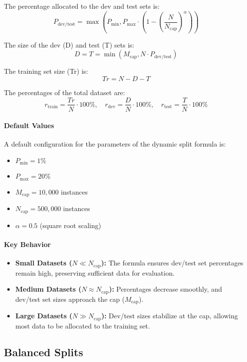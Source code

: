 \documentclass[12pt,openany, draft]{book}
\begin{document}
\vspace{2em}

The percentage allocated to the dev and test sets is:
\[
P_{\text{dev/test}} = \max\left(P_{\text{min}}, P_{\text{max}} \cdot \left(1 - \left(\frac{N}{N_{\text{cap}}}\right)^\alpha\right)\right)
\]

The size of the dev (D) and test (T) sets is:
\[
D = T = \min(M_{\text{cap}}, N \cdot P_{\text{dev/test}})
\]

The training set size (Tr) is:
\[
Tr = N - D - T
\]

The percentages of the total dataset are:
\[
r_{\text{train}} = \frac{Tr}{N} \cdot 100\%, \quad r_{\text{dev}} = \frac{D}{N} \cdot 100\%, \quad r_{\text{test}} = \frac{T}{N} \cdot 100\%
\]

\paragraph{Default Values}
A default configuration for the parameters of the dynamic split formula is:
\begin{itemize}
    \item \(P_{\text{min}} = 1\%\)
    \item \(P_{\text{max}} = 20\%\)
    \item \(M_{\text{cap}} = 10,000\) instances
    \item \(N_{\text{cap}} = 500,000\) instances
    \item \(\alpha = 0.5\) (square root scaling)
\end{itemize}

\paragraph{Key Behavior}
\begin{itemize}
    \item \textbf{Small Datasets (\(N \ll N_{\text{cap}}\)):} The formula ensures dev/test set percentages remain high, preserving sufficient data for evaluation.
    \item \textbf{Medium Datasets (\(N \approx N_{\text{cap}}\)):} Percentages decrease smoothly, and dev/test set sizes approach the cap (\(M_{\text{cap}}\)).
    \item \textbf{Large Datasets (\(N \gg N_{\text{cap}}\)):} Dev/test sizes stabilize at the cap, allowing most data to be allocated to the training set.
\end{itemize}

\subsection{Balanced Splits}
\end{document}
